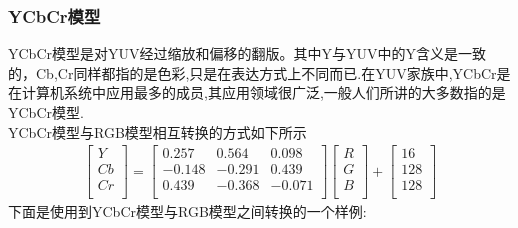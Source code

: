 \documentclass[UTF8,a4paper,10pt]{ctexart}
\begin{document}
\begin{flushleft}
        \subsubsection{YCbCr模型}
        \hspace{2em}YCbCr模型是对YUV经过缩放和偏移的翻版。其中Y与YUV中的Y含义是一致的，Cb,Cr同样都指的是色彩,只是在表达方式上不同而已.在YUV家族中,YCbCr是在计算机系统中应用最多的成员,其应用领域很广泛,一般人们所讲的大多数指的是YCbCr模型.\\
        \hspace{2em}YCbCr模型与RGB模型相互转换的方式如下所示
        \begin{eqnarray}
            \left[\begin{array}{c}
                Y\\
                Cb\\
                Cr\\
            \end{array}\right]=\left[\begin{array}{ccc}
                0.257 & 0.564 & 0.098\\
                -0.148 & -0.291 & 0.439\\
                0.439 & -0.368 & -0.071\\
            \end{array}\right]\left[\begin{array}{c}
                R\\
                G\\
                B\\
            \end{array}\right]+\left[\begin{array}{c}
               16\\
               128\\
               128\\
            \end{array}\right]\nonumber
        \end{eqnarray}
        \hspace{2em}下面是使用到YCbCr模型与RGB模型之间转换的一个样例:
        \begin{figure}[htbp]
            \centering
\end{figure}
\end{flushleft}
\end{document}
